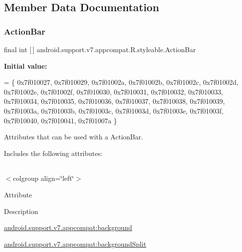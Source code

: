 \subsection{Member Data Documentation}
\mbox{\label{classandroid_1_1support_1_1v7_1_1appcompat_1_1R_1_1styleable_a5941dc15714398e9ec9afaa0155cc1cf}} 
\subsubsection{\texorpdfstring{Action\+Bar}{ActionBar}}
{\footnotesize\ttfamily final int \mbox{[}$\,$\mbox{]} android.\+support.\+v7.\+appcompat.\+R.\+styleable.\+Action\+Bar\hspace{0.3cm}{\ttfamily [static]}}

{\bfseries Initial value\+:}
\begin{DoxyCode}
= \{
            0x7f010027, 0x7f010029, 0x7f01002a, 0x7f01002b,
            0x7f01002c, 0x7f01002d, 0x7f01002e, 0x7f01002f,
            0x7f010030, 0x7f010031, 0x7f010032, 0x7f010033,
            0x7f010034, 0x7f010035, 0x7f010036, 0x7f010037,
            0x7f010038, 0x7f010039, 0x7f01003a, 0x7f01003b,
            0x7f01003c, 0x7f01003d, 0x7f01003e, 0x7f01003f,
            0x7f010040, 0x7f010041, 0x7f01007a
        \}
\end{DoxyCode}
Attributes that can be used with a Action\+Bar. 

Includes the following attributes\+:

\tabulinesep=1mm
\begin{longtabu} spread 0pt [c]{*{0}{|X[-1]}|}
\hline
\end{longtabu}
$<$colgroup align=\char`\"{}left\char`\"{}$>$ 

Attribute

Description 

{\ttfamily \hyperlink{classandroid_1_1support_1_1v7_1_1appcompat_1_1R_1_1styleable_a54388d3e1ae62677a3056097acbf7069}{android.\+support.\+v7.\+appcompat\+:background}}

{\ttfamily \hyperlink{classandroid_1_1support_1_1v7_1_1appcompat_1_1R_1_1styleable_ad35a58b3583d91f8dac919846b6a99c1}{android.\+support.\+v7.\+appcompat\+:background\+Split}}

